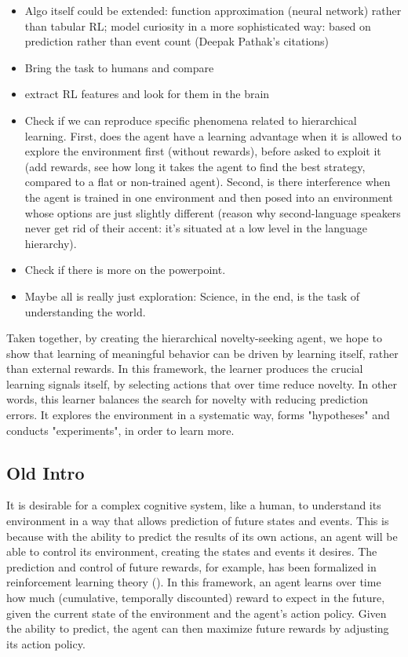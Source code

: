 \documentclass{article}
\begin{document}
\begin{itemize}
	\item Algo itself could be extended: function approximation (neural network) rather than tabular RL; model curiosity in a more sophisticated way: based on prediction rather than event count (Deepak Pathak's citations)
	\item Bring the task to humans and compare
	\item extract RL features and look for them in the brain
	\item Check if we can reproduce specific phenomena related to hierarchical learning. First, does the agent have a learning advantage when it is allowed to explore the environment first (without rewards), before asked to exploit it (add rewards, see how long it takes the agent to find the best strategy, compared to a flat or non-trained agent). Second, is there interference when the agent is trained in one environment and then posed into an environment whose options are just slightly different (reason why second-language speakers never get rid of their accent: it's situated at a low level in the language hierarchy).
	\item Check if there is more on the powerpoint.
	\item Maybe all is really just exploration: Science, in the end, is the task of understanding the world.
\end{itemize}

Taken together, by creating the hierarchical novelty-seeking agent, we hope to show that learning of meaningful behavior can be driven by learning itself, rather than external rewards. In this framework, the learner produces the crucial learning signals itself, by selecting actions that over time reduce novelty. In other words, this learner balances the search for novelty with reducing prediction errors. It explores the environment in a systematic way, forms "hypotheses" and conducts "experiments", in order to learn more. 

\subsection{Old Intro}

It is desirable for a complex cognitive system, like a human, to understand its environment in a way that allows prediction of future states and events. This is because with the ability to predict the results of its own actions, an agent will be able to control its environment, creating the states and events it desires. The prediction and control of future rewards, for example, has been formalized in reinforcement learning theory (\cite{sutton_reinforcement_2017}). In this framework, an agent learns over time how much (cumulative, temporally discounted) reward to expect in the future, given the current state of the environment and the agent's action policy. Given the ability to predict, the agent can then maximize future rewards by adjusting its action policy.
\end{document}
